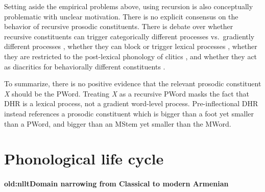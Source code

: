 Setting aside the  empirical problems above, using recursion is also conceptually problematic with unclear motivation.  
There is no explicit consensus on the behavior of recursive prosodic constituents. There is debate over whether recursive constituents can trigger categorically different processes vs.\ gradiently different processes \citep{Ladd-1986-IntonationalPhrasingRecursiveProsodic,ItoMester-2009-ExtendedProsodicWord,ItoMester-2012-RecursiveProsodicPhrasingJapanese,ItoMester-2013-ProsodicSubcategoriesJapanese,Wagner-2010-ProsodyRecursionCoordinate,FrotaVigario-2013-ProsodyMattersReview,Elfner-2015-RecursionProsodicPhrasingIrish}, whether they can block or trigger  lexical processes \citep{Szpyra-1989-PhonoMorphoInterface,Booij-1996-CliticizationProsodicIntegrationDutch,Peperkamp-1997-ProsodicWord,Raffelsiefen-2005-ParadigmvsBoundary,KabakRevithiadou-2009-InterfaceProsodicWordRecursionUgh,Bennett-2018-RecursiveProsodicWordMayan}, whether they are restricted to the post-lexical phonology of clitics \citep{Inkelas-1989-ProsodicLexicon,Booij-1996-CliticizationProsodicIntegrationDutch,Selkirk-1996-ProsodicFunctionWords,Zec-2005-ProsodicDifferenceFunctionWords,Tyler-2019-SimplifyingWordEnglishFunctionalCategories}, and whether they act as diacritics for  behaviorally different constituents \citep{Vogel-2009-StatusCliticGroup,Vogel-2012-Recursion,Vogel-2016-LifeAfterSLH,Vigario-2010-ProsodicWordGroupWordvsPhraseRecursionIndependentDomain,Guzzo-2018-ProsodicCompositePortugese,Miller-2018-PhonologySyntaxInterfacePolysynthesisKiowaSaulteauxOjibwe,Miller-2020-NavigatingPhonologySyntaxInterfaceTriPMapping}. 


To summarize,   there is no positive evidence that the relevant prosodic constituent \textit{X} should be the PWord. Treating \textit{X} as a recursive PWord masks the fact that DHR is a lexical process, not a gradient word-level process.  Pre-inflectional DHR instead references a prosodic constituent which is bigger than a foot yet smaller than a PWord, and bigger than an MStem yet smaller than the MWord. %






\section{Phonological life cycle}
\paragraph{old:nlltDomain narrowing from Classical to modern Armenian}\label{nlttPapersection: reduction: history of reduction in classical}

